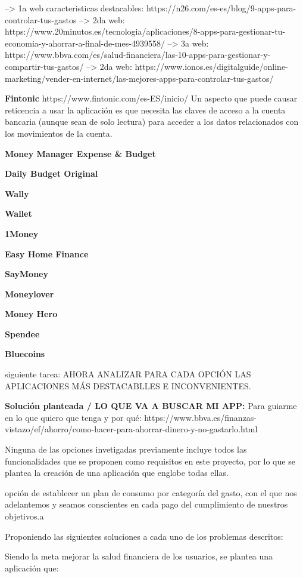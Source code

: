 --> 1a web caracteristicas destacables: https://n26.com/es-es/blog/9-apps-para-controlar-tus-gastos 
--> 2da web: https://www.20minutos.es/tecnologia/aplicaciones/8-apps-para-gestionar-tu-economia-y-ahorrar-a-final-de-mes-4939558/ 
--> 3a web: https://www.bbva.com/es/salud-financiera/las-10-apps-para-gestionar-y-compartir-tus-gastos/ 
--> 2da web: https://www.ionos.es/digitalguide/online-marketing/vender-en-internet/las-mejores-apps-para-controlar-tus-gastos/ 

\textbf{Fintonic} https://www.fintonic.com/es-ES/inicio/ 
Un aspecto que puede causar reticencia a usar la aplicación es que necesita 
las claves de acceso a la cuenta bancaria (aunque sean de solo lectura) 
para acceder a los datos relacionados con los movimientos de la cuenta.


\textbf{Money Manager Expense & Budget} 

\textbf{Daily Budget Original} 

\textbf{Wally} 

\textbf{Wallet} 

\textbf{1Money} 

\textbf{Easy Home Finance} 

\textbf{SayMoney} 

\textbf{Moneylover}

\textbf{Money Hero}

\textbf{Spendee}

\textbf{Bluecoins}


siguiente tarea:
AHORA ANALIZAR PARA CADA OPCIÓN LAS APLICACIONES MÁS DESTACABLLES E INCONVENIENTES.


\textbf{Solución planteada / LO QUE VA A BUSCAR MI APP:}
Para guiarme en lo que quiero que tenga y por qué:
https://www.bbva.es/finanzas-vistazo/ef/ahorro/como-hacer-para-ahorrar-dinero-y-no-gastarlo.html

Ninguna de las opciones invetigadas previamente incluye todos las funcionalidades 
que se proponen como requisitos en este proyecto, por lo que se plantea la creación
de una aplicación que englobe todas ellas.

opción de establecer un plan de consumo por categoría del gasto, con el que nos adelantemos y 
seamos conscientes en cada pago del cumplimiento de nuestros objetivos.a

Proponiendo las siguientes soluciones a cada uno de los problemas descritos:

Siendo la meta mejorar la salud financiera de los usuarios, se plantea una aplicación que:

